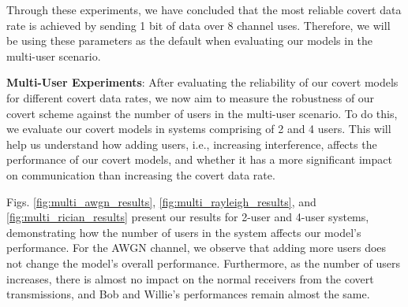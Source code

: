 Through these experiments, we have concluded that the most reliable covert data rate is achieved by sending 1 bit of data over 8 channel uses. Therefore, we will be using these parameters as the default when evaluating our models in the multi-user scenario.

\textbf{Multi-User Experiments}: 
After evaluating the reliability of our covert models for different covert data rates, we now aim to measure the robustness of our covert scheme against the number of users in the multi-user scenario. To do this, we evaluate our covert models in systems comprising of 2 and 4 users. This will help us understand how adding users, i.e., increasing interference, affects  the performance of our covert models, and whether it has a more significant impact on communication than increasing the covert data rate.

Figs. \ref{fig:multi_awgn_results}, \ref{fig:multi_rayleigh_results}, and \ref{fig:multi_rician_results} present our results for 2-user and 4-user systems, demonstrating how the number of users in the system affects our model's performance. For the AWGN channel, we observe that adding more users does not change the model's overall performance. Furthermore, as the number of users increases, there is almost no impact on the normal receivers from the covert transmissions, and Bob and Willie's performances remain almost the same.

